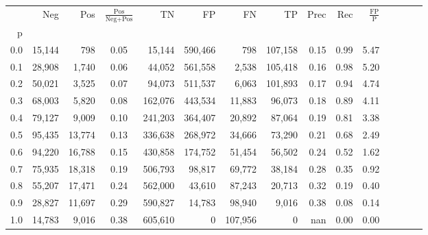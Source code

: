 \begin{tabular}{rrrcrrrrrrrrrrr}
\toprule
{} &     Neg &     Pos & $\frac{\text{Pos}}{\text{Neg}+\text{Pos}}$ &       TN &       FP &       FN &       TP &  Prec &   Rec & $\frac{\text{FP}}{\text{P}}$ \\
p   &         &         &                                            &          &          &          &          &       &       &                              \\
\midrule
0.0 &  15,144 &     798 &                                       0.05 &   15,144 &  590,466 &      798 &  107,158 &  0.15 &  0.99 &                         5.47 \\
0.1 &  28,908 &   1,740 &                                       0.06 &   44,052 &  561,558 &    2,538 &  105,418 &  0.16 &  0.98 &                         5.20 \\
0.2 &  50,021 &   3,525 &                                       0.07 &   94,073 &  511,537 &    6,063 &  101,893 &  0.17 &  0.94 &                         4.74 \\
0.3 &  68,003 &   5,820 &                                       0.08 &  162,076 &  443,534 &   11,883 &   96,073 &  0.18 &  0.89 &                         4.11 \\
0.4 &  79,127 &   9,009 &                                       0.10 &  241,203 &  364,407 &   20,892 &   87,064 &  0.19 &  0.81 &                         3.38 \\
0.5 &  95,435 &  13,774 &                                       0.13 &  336,638 &  268,972 &   34,666 &   73,290 &  0.21 &  0.68 &                         2.49 \\
0.6 &  94,220 &  16,788 &                                       0.15 &  430,858 &  174,752 &   51,454 &   56,502 &  0.24 &  0.52 &                         1.62 \\
0.7 &  75,935 &  18,318 &                                       0.19 &  506,793 &   98,817 &   69,772 &   38,184 &  0.28 &  0.35 &                         0.92 \\
0.8 &  55,207 &  17,471 &                                       0.24 &  562,000 &   43,610 &   87,243 &   20,713 &  0.32 &  0.19 &                         0.40 \\
0.9 &  28,827 &  11,697 &                                       0.29 &  590,827 &   14,783 &   98,940 &    9,016 &  0.38 &  0.08 &                         0.14 \\
1.0 &  14,783 &   9,016 &                                       0.38 &  605,610 &        0 &  107,956 &        0 &   nan &  0.00 &                         0.00 \\
\bottomrule
\end{tabular}
